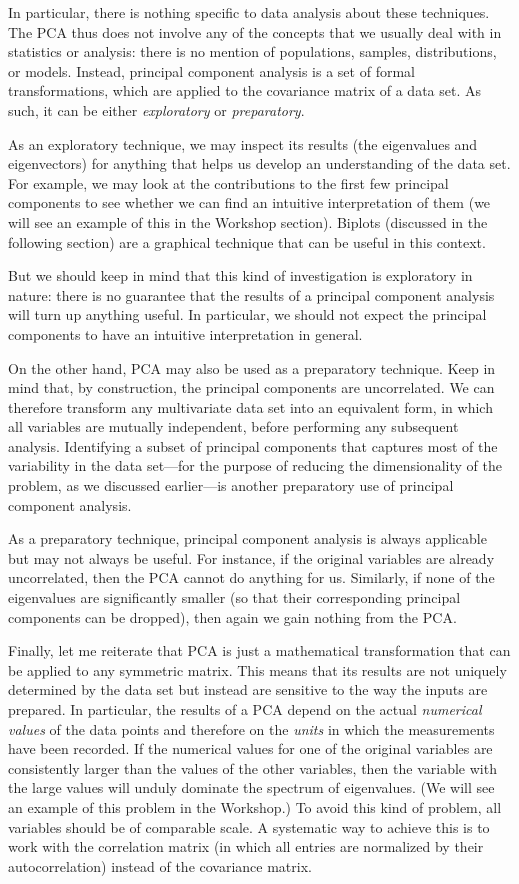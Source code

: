 In particular, there is nothing specific to data analysis about these
techniques. The PCA thus does not involve any of the concepts that we
usually deal with in statistics or analysis: there is no mention of
populations, samples, distributions, or models. Instead, principal
component analysis is a set of formal transformations, which are
applied to the covariance matrix of a data set. As such, it can be
either \emph{exploratory} or \emph{preparatory}.

As an exploratory technique, we may inspect its results (the
eigenvalues and eigenvectors) for anything that helps us develop an
understanding of the data set. For example, we may look at the
contributions to the first few principal components to see whether we
can find an intuitive interpretation of them (we will see an example
of this in the Workshop section).  Biplots (discussed in the following
section) are a graphical technique that can be useful in this context.

But we should keep in mind that this kind of investigation is
exploratory in nature: there is no guarantee that the results of a
principal component analysis will turn up anything useful. In
particular, we should not expect the principal components to have an
intuitive interpretation in general.

On the other hand, PCA may also be used as a preparatory technique.
Keep in mind that, by construction, the principal components are
uncorrelated. We can therefore transform any multivariate data set into
an equivalent form, in which all variables are mutually independent,
before performing any subsequent analysis.  Identifying a subset of
principal components that captures most of the variability in the data
set---for the purpose of reducing the dimensionality of the problem,
as we discussed earlier---is another preparatory use of principal
component analysis.

As a preparatory technique, principal component analysis is always
applicable but may not always be useful. For instance, if the original
variables are already uncorrelated, then the PCA cannot do anything
for us. Similarly, if none of the eigenvalues are significantly
smaller (so that their corresponding principal components can be
dropped), then again we gain nothing from the PCA.

Finally, let me reiterate that PCA is just a mathematical
transformation that can be applied to any symmetric matrix. This means
that its results are not uniquely determined by the data set but
instead are sensitive to the way the inputs are prepared. In
particular, the results of a PCA depend on the actual \emph{numerical
  values} of the data points and therefore on the \emph{units} in
which the measurements have been recorded. If the numerical values for
one of the original variables are consistently larger than the values
of the other variables, then the variable with the large values will
unduly dominate the spectrum of eigenvalues. (We will see an example
of this problem in the Workshop.) To avoid this kind of problem, all
variables should be of comparable scale. A systematic way to achieve
this is to work with the correlation matrix (in which all entries are
normalized by their autocorrelation) instead of the covariance matrix.


